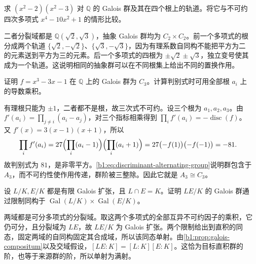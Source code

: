 \begin{exercise}\label{b1:ex:19-reducible-permutation}
	求 \((x^2-2)(x^2-3)\) 对 \(\mathbb Q\) 的 Galois 群及其在四个根上的轨道。将它与不可约四次多项式 \(x^4-10x^2+1\) 的情形比较。
\end{exercise}
\begin{solution}
	二者分裂域都是 \(\mathbb Q(\sqrt2,\sqrt3)\)，抽象 Galois 群均为 \(C_2\times C_2\)。前一个多项式的根分成两个轨道 \(\{\sqrt2,-\sqrt2\}\)、\(\{\sqrt3,-\sqrt3\}\)，因为有理系数自同构不能把平方为二的元素送到平方为三的元素。后一个多项式的四根为 \(\pm\sqrt2\pm\sqrt3\)，独立变号使其成为一个轨道。这说明相同的抽象群可以在不同根集上给出不同的置换作用。
\end{solution}

\begin{exercise}\label{b1:ex:19-cyclic-cubic}
	证明 \(f=x^3-3x-1\) 在 \(\mathbb Q\) 上的 Galois 群为 \(C_3\)。计算判别式时可用全部根 \(a_i\) 上的导数乘积。
\end{exercise}
\begin{solution}
	有理根只能为 \(\pm1\)，二者都不是根，故三次式不可约。设三个根为 \(a_1,a_2,a_3\)。由 \(f'(a_i)=\prod_{j\ne i}(a_i-a_j)\)，对三个指标相乘得到 \(\prod_i f'(a_i)=-\operatorname{disc}(f)\)。又 \(f'(x)=3(x-1)(x+1)\)，所以
	\[
		\prod_i f'(a_i)=27\Bigl(\prod_i(a_i-1)\Bigr)\Bigl(\prod_i(a_i+1)\Bigr) =27\bigl(-f(1)\bigr)\bigl(-f(-1)\bigr)=-81.
	\]
	故判别式为 \(81\)，是非零平方。\eqref{b1:eq:discriminant-alternating-group}说明群包含于 \(A_3\)，而不可约性使作用传递，群阶被三整除。因此它就是 \(A_3\cong C_3\)。
\end{solution}

\begin{exercise}\label{b1:ex:19-product-groups}
	设 \(L/K,E/K\) 都是有限 Galois 扩张，且 \(L\cap E=K\)。证明 \(LE/K\) 的 Galois 群通过限制同构于 \(\operatorname{Gal}(L/K)\times\operatorname{Gal}(E/K)\)。
\end{exercise}
\begin{solution}
	两域都是可分多项式的分裂域。取这两个多项式的全部互异不可约因子的乘积，它仍可分，且分裂域为 \(LE\)，故 \(LE/K\) 为 Galois 扩张。两个限制给出到直积的同态，固定两域的自同构固定其合成域，所以该同态单射。由\cref{b1:prop:galois-compositum}以及交域假设，\([LE:K]=[L:K][E:K]\)。这恰为目标直积群的阶，也等于来源群的阶，所以单射为满射。
\end{solution}

